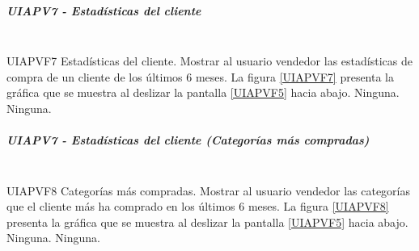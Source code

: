 \subparagraph{UIAPV7 - Estadísticas del cliente} ~\\

{UIAPVF7} %
{Estadísticas del cliente.}  %
{Mostrar al usuario vendedor las estadísticas de compra de un cliente de los últimos 6 meses.} %
{La figura \ref{UIAPVF7} presenta la gráfica que se muestra al deslizar la pantalla \ref{UIAPVF5} hacia abajo.} %
{Ninguna.} %
{Ninguna.} %

\subparagraph{UIAPV7 - Estadísticas del cliente (Categorías más compradas)} ~\\

{UIAPVF8} %
{Categorías más compradas.}  %
{Mostrar al usuario vendedor las categorías que el cliente más ha comprado en los últimos 6 meses.} %
{La figura \ref{UIAPVF8} presenta la gráfica que se muestra al deslizar la pantalla \ref{UIAPVF5} hacia abajo.} %
{Ninguna.} %
{Ninguna.} %

